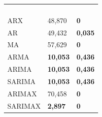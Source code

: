 \begin{table}[H]
\begin{subtable}{0.46\linewidth}
\begin{tabular}{@{}lll@{}}
			& & \\
			& & \\
			& & \\
			& & \\ \midrule
			ARX & 48,870 & \textbf{0} \\
			AR & 49,432 & \textbf{0,035} \\
			MA & 57,629 & \textbf{0} \\
			ARMA & \textbf{10,053} & \textbf{0,436} \\
			ARIMA & \textbf{10,053} & \textbf{0,436} \\
			SARIMA & \textbf{10,053} & \textbf{0,436} \\
			ARIMAX & 70,458 & \textbf{0} \\
			SARIMAX & \textbf{2,897} & \textbf{0} \\ \bottomrule
		\end{tabular}
	\end{subtable}
	
	
	\vspace{0.5cm}
	
\end{table}





